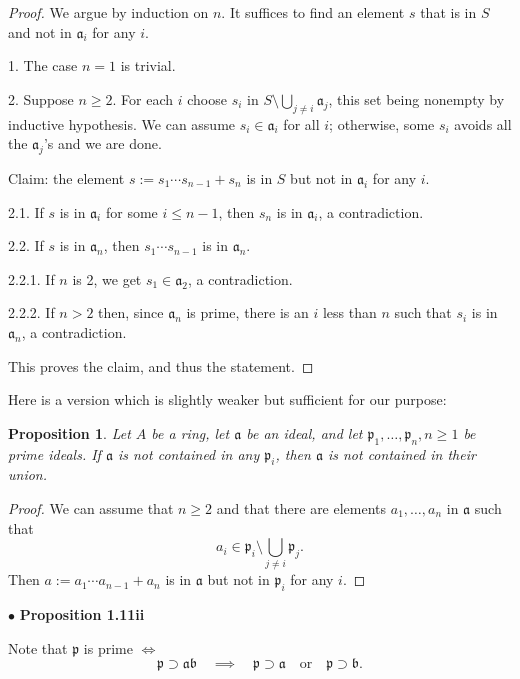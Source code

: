 \documentclass[parskip=half,fontsize=12pt]{scrartcl}%
\newcommand{\mf}{\mathfrak}
\newcommand{\aaa}{\mf a}
\newcommand{\bbb}{\mf b}
\newcommand{\ppp}{\mf p}
\newcommand{\bu}{\bullet}
\newtheorem{prop}[thm]{Proposition}
\begin{document}
\begin{proof} 
We argue by induction on $n$. It suffices to find an element $s$ that is in $S$ and not in $\aaa_i$ for any $i$. 

1. The case $n=1$ is trivial. 

2. Suppose $n\ge2$. For each $i$ choose $s_i$ in $S\setminus\bigcup_{j \ne i}\aaa_j$, this set being nonempty by inductive hypothesis. We can assume $s_i \in \aaa_i$ for all $i$; otherwise, some $s_i$ avoids all the $\aaa_j$'s and we are done. 

Claim: the element $s:=s_1\cdots s_{n-1}+s_n$ is in $S$ but not in $\aaa_i$ for any $i$. 

2.1. If $s$ is in $\aaa_i$ for some $i\le n-1$, then $s_n$ is in $\aaa_i$, a contradiction. 

2.2. If $s$ is in $\aaa_n$, then $s_1\cdots s_{n-1}$ is in $\aaa_n$. 

2.2.1. If $n$ is 2, we get $s_1\in \aaa_2$, a contradiction.

2.2.2. If $n>2$ then, since $\aaa_n$ is prime, there is an $i$ less than $n$ such that $s_i$ is in $\aaa_n$, a contradiction.

This proves the claim, and thus the statement. 
\end{proof}

Here is a version which is slightly weaker but sufficient for our purpose:

\begin{prop}\label{111i}
Let $A$ be a ring, let $\aaa$ be an ideal, and let $\ppp_1,\dots,\ppp_n,n\ge1$ be prime ideals. If $\mf a$ is not contained in any $\ppp_i$, then $\mf a$ is not contained in their union.
\end{prop}
\begin{proof} 
We can assume that $n\ge2$ and that there are elements $a_1,\dots,a_n$ in $\mf a$ such that 
$$
a_i\in\ppp_i\setminus\bigcup_{j \ne i}\ppp_j.
$$ 
Then $a:=a_1\cdots a_{n-1}+a_n$ is in $\mf a$ but not in $\ppp_i$ for any $i$.
\end{proof}


$\bu$ \textbf{Proposition 1.11ii}%

Note that $\ppp$ is prime $\iff$
$$
\ppp\supset\mf a\bbb\quad\implies\quad\ppp\supset\mf a\quad\text{or}\quad\ppp\supset\bbb.
$$
\end{document}
